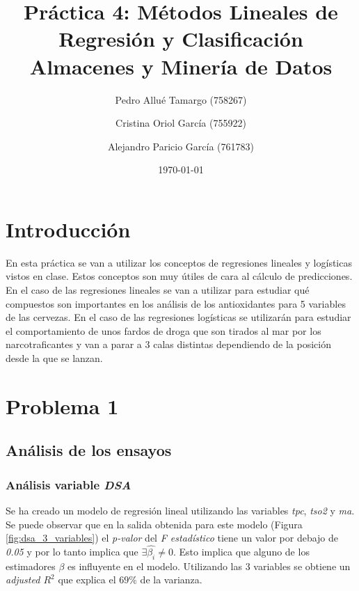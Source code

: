 \documentclass{article}
\begin{document}
\begin{titlepage}
\title{\textbf{
    {\Huge Práctica 4: Métodos Lineales de Regresión y Clasificación}\\
    {\Large Almacenes y Minería de Datos}
}}
\author{
    Pedro Allué Tamargo (758267)
    \and
    Cristina Oriol García (755922)
    \and
    Alejandro Paricio García (761783)
}
\date{\today}
\clearpage\maketitle
\thispagestyle{empty}
\end{titlepage}

\tableofcontents

\newpage
\section{Introducción}

En esta práctica se van a utilizar los conceptos de regresiones lineales y logísticas vistos en clase. Estos conceptos son muy útiles de cara al cálculo de predicciones. En el caso de las regresiones lineales se van a utilizar para estudiar qué compuestos son importantes en los análisis de los antioxidantes para 5 variables de las cervezas. En el caso de las regresiones logísticas se utilizarán para estudiar el comportamiento de unos fardos de droga que son tirados al mar por los narcotraficantes y van a parar a 3 calas distintas dependiendo de la posición desde la que se lanzan.\\

\newpage
\section{Problema 1}
\subsection{Análisis de los ensayos}

\subsubsection{Análisis variable \textit{DSA}}

Se ha creado un modelo de regresión lineal utilizando las variables \textit{tpc}, \textit{tso2} y \textit{ma}. Se puede observar que en la salida obtenida para este modelo (Figura \ref{fig:dsa_3_variables}) el \textit{p-valor} del \textit{F estadístico} tiene un valor por debajo de \textit{0.05} y por lo tanto implica que $\exists \hat{\beta_i}\neq0$. Esto implica que alguno de los estimadores $\beta$ es influyente en el modelo. Utilizando las 3 variables se obtiene un \textit{adjusted $R^2$} que explica el $69\%$ de la varianza.\\
\end{document}

